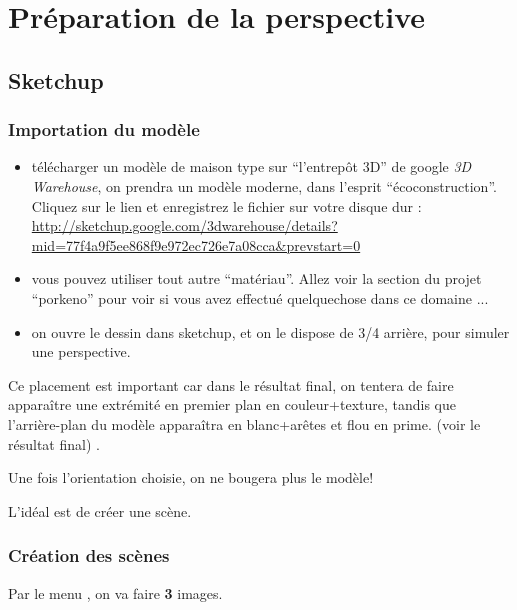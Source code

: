 \documentclass[a4paper,12pt,french]{sphinxmanual}
\begin{document}
\section{Préparation de la perspective}
\label{psd/prepa-image_su+psd:prepa-image-su-psd}\label{psd/prepa-image_su+psd:preparation-de-la-perspective}\label{psd/prepa-image_su+psd::doc}

\subsection{Sketchup}
\label{psd/prepa-image_su+psd:sketchup}

\subsubsection{Importation du modèle}
\label{psd/prepa-image_su+psd:importation-du-modele}
\noindent{}
\begin{itemize}
\item {} 
télécharger un modèle de maison type sur ``l'entrepôt 3D'' de google \emph{3D Warehouse}, on prendra un modèle moderne, dans l'esprit ``écoconstruction''. Cliquez sur le lien et enregistrez le fichier sur votre disque dur : \url{http://sketchup.google.com/3dwarehouse/details?mid=77f4a9f5ee868f9e972ec726e7a08cca\&prevstart=0}

\item {} 
vous pouvez utiliser tout autre ``matériau''. Allez voir la section {\hyperref[init_su+acad/demarrage:demarrage\string-init\string-su\string-acad]{}} du projet ``porkeno'' pour voir si vous avez effectué quelquechose dans ce domaine ...

\item {} 
on ouvre le dessin dans sketchup, et on le dispose de 3/4 arrière, pour simuler une perspective.

\end{itemize}

Ce placement est important car dans le résultat final, on tentera de faire apparaître une extrémité en premier plan en couleur+texture, tandis que l'arrière-plan du modèle apparaîtra en blanc+arêtes et flou en prime. (voir le résultat final) .

Une fois l'orientation choisie, on ne bougera plus le modèle!

L'idéal est de créer une scène.


\subsubsection{Création des scènes}
\label{psd/prepa-image_su+psd:creation-des-scenes}
Par le menu , on va faire \textbf{3} images.
\end{document}
